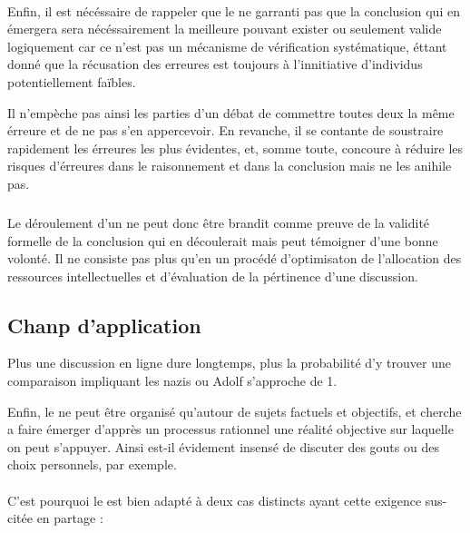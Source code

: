 \paragraph{}
Enfin, il est nécéssaire de rappeler que le \mainabbr{} ne garranti pas que la conclusion qui en émergera sera nécéssairement la meilleure pouvant exister ou seulement valide logiquement car ce n’est pas un mécanisme de vérification systématique, éttant donné que la récusation des erreures est toujours à l’innitiative d’individus potentiellement faïbles.

Il n’empèche pas ainsi les parties d’un débat de commettre toutes deux la même érreure et de ne pas s’en appercevoir. En revanche, il se contante de soustraire rapidement les érreures les plus évidentes, et, somme toute, concoure à réduire les risques d’érreures dans le raisonnement et dans la conclusion mais ne les anihile pas.

\subparagraph{}
Le déroulement d’un \mainabbr{} ne peut donc être brandit comme preuve de la validité formelle de la conclusion qui en découlerait mais peut témoigner d’une bonne volonté. Il ne consiste pas plus qu’en un procédé d’optimisaton de l’allocation des ressources intellectuelles et d’évaluation de la pértinence d’une discussion.

\subsection{Chanp d’application}
\epigraph{Plus une discussion en ligne dure longtemps, plus la probabilité d’y trouver une comparaison impliquant les nazis ou Adolf  s’approche de 1.}{}
Enfin, le \mainabbr{} ne peut être organisé qu’autour de sujets factuels et objectifs, et cherche a faire émerger d’apprès un processus rationnel une réalité objective sur laquelle on peut s’appuyer. Ainsi est-il évidement insensé de discuter des gouts ou des choix personnels, par exemple.

\paragraph*{}
C’est pourquoi le \mainabbr{} est bien adapté à deux cas distincts ayant cette exigence sus-citée en partage :

